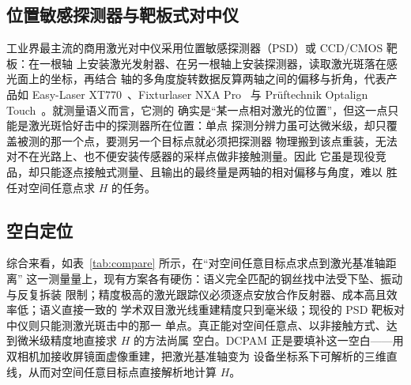 \subsection{位置敏感探测器与靶板式对中仪}

工业界最主流的商用激光对中仪采用位置敏感探测器（PSD）或 CCD/CMOS 靶板：在一根轴
上安装激光发射器、在另一根轴上安装探测器，读取激光斑落在感光面上的坐标，再结合
轴的多角度旋转数据反算两轴之间的偏移与折角，代表产品如 Easy-Laser
XT770~\cite{easylaser_xt770}、Fixturlaser NXA Pro~\cite{fixturlaser_nxa} 与
Pr\"uftechnik Optalign Touch~\cite{pruftechnik_optalign}。就测量语义而言，它测的
确实是“某一点相对激光的位置”，但这一点只能是激光斑恰好击中的探测器所在位置：单点
探测分辨力虽可达微米级，却只覆盖被测的那一个点，要测另一个目标点就必须把探测器
物理搬到该点重装，无法对不在光路上、也不便安装传感器的采样点做非接触测量。因此
它虽是现役竞品，却只能逐点接触式测量、且输出的最终量是两轴的相对偏移与角度，难以
胜任对空间任意点求 $H$ 的任务。

\subsection{空白定位}

综合来看，如表~\ref{tab:compare} 所示，在“对空间任意目标点求点到激光基准轴距离”
这一测量量上，现有方案各有硬伤：语义完全匹配的钢丝找中法受下坠、振动与反复拆装
限制；精度极高的激光跟踪仪必须逐点安放合作反射器、成本高且效率低；语义直接一致的
学术双目激光线重建精度只到毫米级；现役的 PSD 靶板对中仪则只能测激光斑击中的那一
单点。真正能对空间任意点、以非接触方式、达到微米级精度地直接求 $H$ 的方法尚属
空白。DCPAM 正是要填补这一空白——用双相机加接收屏镜面虚像重建，把激光基准轴变为
设备坐标系下可解析的三维直线，从而对空间任意目标点直接解析地计算 $H$。
